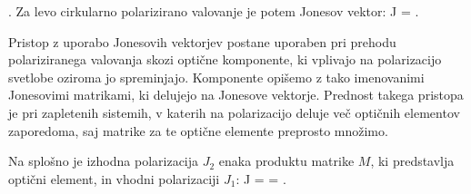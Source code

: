 \left[\begin{array}{c}
1\\
-i\\
\end{array}\right]\!\!.
\label{eq:03_46}
\eeq
Za levo cirkularno polarizirano valovanje je potem Jonesov
vektor:
\beq
J = 
\left[\begin{array}{c}
1\\
i\\
\end{array}\right]\!\!.
\label{eq:03_47}
\eeq

Pristop z uporabo Jonesovih vektorjev postane uporaben pri prehodu
polariziranega valovanja skozi optične komponente, ki vplivajo na 
polarizacijo svetlobe oziroma jo spreminjajo. Komponente opišemo z tako
imenovanimi Jonesovimi matrikami, ki delujejo na Jonesove vektorje. 
Prednost takega pristopa je pri zapletenih sistemih, v katerih
na polarizacijo deluje več optičnih elementov zaporedoma, saj
matrike za te optične elemente preprosto množimo.

Na splošno je izhodna polarizacija $J_2$ enaka produktu
matrike $M$, ki predstavlja optični element,
in vhodni polarizaciji $J_1$:
\beq
J = \left[\begin{array}{c}
J_{2x}\\
J_{2y}\\
\end{array}\right] = 
\left[\begin{array}{cc}
M_{11}& M_{12}\\
M_{21}& M_{22}\\
\end{array}\right]\cdot
\left[\begin{array}{c}
J_{1x}\\
J_{1y}\\
\end{array}\right]\!\!.
\label{eq:03_48}
\eeq

